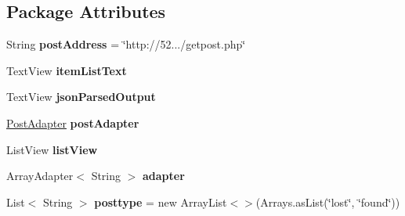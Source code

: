 \subsection*{\-Package \-Attributes}
\begin{DoxyCompactItemize}
\item 
\hypertarget{classcom_1_1example_1_1sel_1_1lostfound_1_1FeedFragment_a93e4b49c719547b375ae827d67d59b7e}{\-String {\bfseries post\-Address} = \char`\"{}http\-://52.../getpost.\-php\char`\"{}}\label{classcom_1_1example_1_1sel_1_1lostfound_1_1FeedFragment_a93e4b49c719547b375ae827d67d59b7e}

\item 
\hypertarget{classcom_1_1example_1_1sel_1_1lostfound_1_1FeedFragment_ac53cb6f2e134f986b2854dd1e52db04a}{\-Text\-View {\bfseries item\-List\-Text}}\label{classcom_1_1example_1_1sel_1_1lostfound_1_1FeedFragment_ac53cb6f2e134f986b2854dd1e52db04a}

\item 
\hypertarget{classcom_1_1example_1_1sel_1_1lostfound_1_1FeedFragment_a01c44ffc7184b293c7f3bbc9feb842fd}{\-Text\-View {\bfseries json\-Parsed\-Output}}\label{classcom_1_1example_1_1sel_1_1lostfound_1_1FeedFragment_a01c44ffc7184b293c7f3bbc9feb842fd}

\item 
\hypertarget{classcom_1_1example_1_1sel_1_1lostfound_1_1FeedFragment_aaa716b67058667e9283096e57d39e4a9}{\hyperlink{classcom_1_1example_1_1sel_1_1lostfound_1_1PostAdapter}{\-Post\-Adapter} {\bfseries post\-Adapter}}\label{classcom_1_1example_1_1sel_1_1lostfound_1_1FeedFragment_aaa716b67058667e9283096e57d39e4a9}

\item 
\hypertarget{classcom_1_1example_1_1sel_1_1lostfound_1_1FeedFragment_af0734f2ee44a9dcdd95b59d595e44b4c}{\-List\-View {\bfseries list\-View}}\label{classcom_1_1example_1_1sel_1_1lostfound_1_1FeedFragment_af0734f2ee44a9dcdd95b59d595e44b4c}

\item 
\hypertarget{classcom_1_1example_1_1sel_1_1lostfound_1_1FeedFragment_aa9ffcd7455b3051f27d013247d15f787}{\-Array\-Adapter$<$ \-String $>$ {\bfseries adapter}}\label{classcom_1_1example_1_1sel_1_1lostfound_1_1FeedFragment_aa9ffcd7455b3051f27d013247d15f787}

\item 
\hypertarget{classcom_1_1example_1_1sel_1_1lostfound_1_1FeedFragment_ae267efafc50372bea070ccc2cae34e6c}{\-List$<$ \-String $>$ {\bfseries posttype} = new \-Array\-List$<$$>$(\-Arrays.\-as\-List(\char`\"{}lost\char`\"{}, \char`\"{}found\char`\"{}))}\label{classcom_1_1example_1_1sel_1_1lostfound_1_1FeedFragment_ae267efafc50372bea070ccc2cae34e6c}

\end{DoxyCompactItemize}


